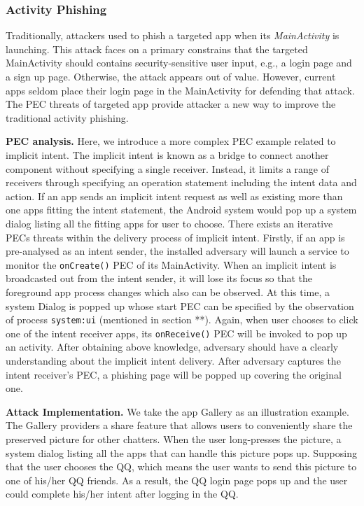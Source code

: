 %
%

\subsubsection{Activity Phishing}
Traditionally, attackers used to phish a  targeted app when its \textit{MainActivity} is launching. This attack faces on a primary constrains that the targeted  MainActivity should contains security-sensitive user input, e.g., a login page and a sign up page. Otherwise, the attack appears out of value. However, current apps seldom place their login page in the MainActivity for defending that attack. The PEC threats of targeted app provide attacker a new way to improve the traditional activity phishing.  

\textbf{PEC analysis.} Here, we introduce a more complex PEC example related to implicit intent. The implicit intent is known as a bridge to connect another component without specifying a single receiver. Instead, it limits a range of receivers through specifying an operation statement including the intent data and action. If an app sends an implicit intent request as well as existing more than one apps fitting the intent statement, the Android system would pop up a system dialog listing all the fitting apps for user to choose. There exists an iterative PECs threats within the delivery process of implicit intent. Firstly, if an app is pre-analysed as an intent sender, the installed adversary will launch a service to monitor the \texttt{onCreate()} PEC of its MainActivity. When an implicit intent is broadcasted out from the intent sender, it will lose its focus so that the foreground app process changes which also can be observed. At this time, a system Dialog is popped up whose start PEC can be specified by the observation of process \texttt{system:ui} (mentioned in section **). Again, when user chooses to click one of the intent receiver apps, its \texttt{onReceive()} PEC will be invoked to pop up an activity. After obtaining above knowledge, adversary should have a clearly understanding about the implicit intent delivery. After adversary captures the intent receiver's PEC, a phishing page will be popped up covering the original one.


\textbf{Attack Implementation.}
We take the app Gallery as an illustration example. The Gallery providers a share feature that allows users to conveniently share the preserved picture for other chatters. When the user long-presses the picture, a system dialog listing all the apps that can handle this picture pops up. Supposing that the user chooses the QQ, which means the user wants to send this picture to one of his/her QQ friends. As a result, the QQ login page pops up and the user could complete his/her intent after logging in the QQ.

